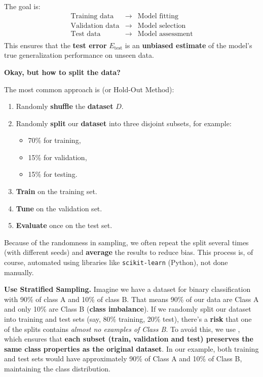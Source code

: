 \noindent
The goal is:
\begin{equation*}
    \begin{array}{rcl}
        \text{Training data} & \rightarrow & \text{Model fitting} \\
        \text{Validation data} & \rightarrow & \text{Model selection} \\
        \text{Test data} & \rightarrow & \text{Model assessment} \\
    \end{array}
\end{equation*}
This ensures that the \textbf{test error} $E_{\text{test}}$ is an \textbf{unbiased estimate} of the model's true generalization performance on unseen data.

\highspace
\begin{flushleft}
    \textcolor{Green3}{ \textbf{Okay, but how to split the data?}}
\end{flushleft}
The most common approach is  (or Hold-Out Method):
\begin{enumerate}
    \item Randomly \textbf{shuffle} the \textbf{dataset} $D$.
    \item Randomly \textbf{split} our \textbf{dataset} into three disjoint subsets, for example:
    \begin{itemize}
        \item 70\% for training,
        \item 15\% for validation,
        \item 15\% for testing.
    \end{itemize}
    \item \textbf{Train} on the training set.
    \item \textbf{Tune} on the validation set.
    \item \textbf{Evaluate} once on the test set.
\end{enumerate}
Because of the randomness in sampling, we often repeat the split several times (with different seeds) and \textbf{average} the results to reduce bias. This process is, of course, automated using libraries like \texttt{scikit-learn} (Python), not done manually.

\highspace
\textcolor{Red2}{ \textbf{Use Stratified Sampling.}} Imagine we have a dataset for binary classification with 90\% of class A and 10\% of class B. That means 90\% of our data are Class A and only 10\% are Class B (\textbf{class imbalance}). If we randomly split our dataset into training and test sets (say, 80\% training, 20\% test), there's a \textbf{risk} that one of the splits contains \emph{almost no examples of Class B}. To avoid this, we use , which ensures that \textbf{each subset (train, validation and test) preserves the same class properties as the original dataset}. In our example, both training and test sets would have approximately 90\% of Class A and 10\% of Class B, maintaining the class distribution. 